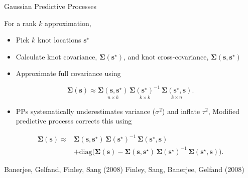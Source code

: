 \documentclass[11pt,ignorenonframetext,]{beamer}
\providecommand{\tightlist}{%
  \setlength{\itemsep}{0pt}\setlength{\parskip}{0pt}}
\begin{document}
\begin{frame}{Gaussian Predictive Processes}

\small

For a rank \(k\) approximation,

\begin{itemize}
\item
  Pick \(k\) knot locations \(\bm{s}^\star\)
\item
  Calculate knot covariance, \(\bm{\Sigma}(\bm{s}^\star)\), and knot
  cross-covariance, \(\bm{\Sigma}(\bm{s}, \bm{s}^\star)\)
\item
  Approximate full covariance using
\end{itemize}

\vspace{-2mm}
\[ \bm{\Sigma}(\bm{s}) \approx \underset{n \times k}{\bm{\Sigma}(\bm{s},\bm{s}^\star)} \, \underset{k \times k}{\bm{\Sigma}(\bm{s}^\star)^{-1}} \, \underset{k \times n}{\bm{\Sigma}(\bm{s}^\star,\bm{s})}. \]

\begin{itemize}
\tightlist
\item
  PPs systematically underestimates variance (\(\sigma^2\)) and inflate
  \(\tau^2\), Modified predictive processs corrects this using
\end{itemize}

\vspace{-2mm} \[
\begin{aligned}
\bm{\Sigma}(\bm{s}) \approx &
\bm{\Sigma}(\bm{s},\bm{s}^\star) \, \bm{\Sigma}(\bm{s}^\star)^{-1} \, \bm{\Sigma}(\bm{s}^\star,\bm{s}) \\
&+ \text{diag}\Big(\bm{\Sigma}(\bm{s}) - \bm{\Sigma}(\bm{s},\bm{s}^\star) \, \bm{\Sigma}(\bm{s}^\star)^{-1} \, \bm{\Sigma}(\bm{s}^\star,\bm{s})\Big).
\end{aligned}
\]

\vspace{4mm}

\footnotesize

\begin{center}
Banerjee, Gelfand, Finley, Sang (2008) \quad Finley, Sang, Banerjee, Gelfand (2008)
\end{center}

\end{frame}
\end{document}
